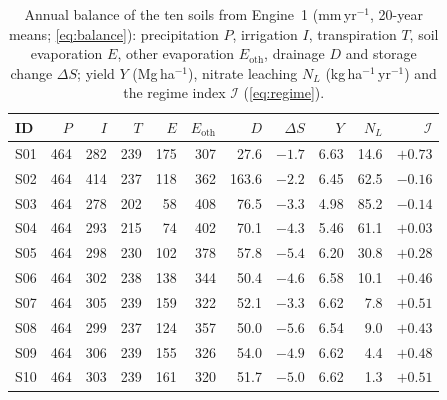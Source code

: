 \begin{table}[H]\centering\small
\caption{Annual balance of the ten soils from Engine~1 (mm\,yr$^{-1}$, 20-year means; \cref{eq:balance}): precipitation $P$, irrigation $I$, transpiration $T$, soil evaporation $E$, other evaporation $E_{\mathrm{oth}}$, drainage $D$ and storage change $\Delta S$; yield $Y$ (Mg\,ha$^{-1}$), nitrate leaching $N_L$ (kg\,ha$^{-1}$\,yr$^{-1}$) and the regime index $\mathcal I$ (\cref{eq:regime}).}
\label{tab:swa-bal}
\begin{tabular}{lrrrrrrrrrr}
\toprule
ID & $P$ & $I$ & $T$ & $E$ & $E_{\mathrm{oth}}$ & $D$ & $\Delta S$ & $Y$ & $N_L$ & $\mathcal I$\\\midrule
S01 & 464 & 282 & 239 & 175 & 307 & 27.6 & $-1.7$ & 6.63 & 14.6 & $+0.73$\\
S02 & 464 & 414 & 237 & 118 & 362 & 163.6 & $-2.2$ & 6.45 & 62.5 & $-0.16$\\
S03 & 464 & 278 & 202 & 58 & 408 & 76.5 & $-3.3$ & 4.98 & 85.2 & $-0.14$\\
S04 & 464 & 293 & 215 & 74 & 402 & 70.1 & $-4.3$ & 5.46 & 61.1 & $+0.03$\\
S05 & 464 & 298 & 230 & 102 & 378 & 57.8 & $-5.4$ & 6.20 & 30.8 & $+0.28$\\
S06 & 464 & 302 & 238 & 138 & 344 & 50.4 & $-4.6$ & 6.58 & 10.1 & $+0.46$\\
S07 & 464 & 305 & 239 & 159 & 322 & 52.1 & $-3.3$ & 6.62 & 7.8 & $+0.51$\\
S08 & 464 & 299 & 237 & 124 & 357 & 50.0 & $-5.6$ & 6.54 & 9.0 & $+0.43$\\
S09 & 464 & 306 & 239 & 155 & 326 & 54.0 & $-4.9$ & 6.62 & 4.4 & $+0.48$\\
S10 & 464 & 303 & 239 & 161 & 320 & 51.7 & $-5.0$ & 6.62 & 1.3 & $+0.51$\\\bottomrule
\end{tabular}
\end{table}

